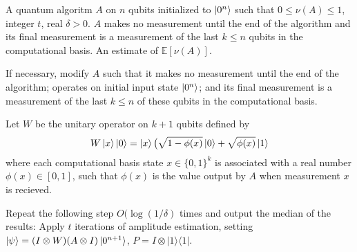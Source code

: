 \documentclass{article}
\begin{document}
\pagestyle{empty} 

\begin{algorithm}[ht]
	\caption{} 
	\begin{algorithmic}[1]

		\Require  A quantum algoritm $A$ on $n$ qubits initialized to $\ket{0^n}$ such that $0\leq \nu(A) \leq 1$, integer $t$, real $\delta>0$. $A$ makes no measurement until the end of the algorithm and its final measurement is a measurement of the last $k\leq n$ qubits in the computational basis.
		\Ensure An estimate of $\mathbb{E}[\nu(A)]$.
		\vspace{10pt}
		\Statex 
		
		\State If necessary, modify $A$ such that it makes no measurement until the end of the algorithm; operates on initial input state $\ket{0^n}$; and its final measurement is a measurement of the last $k\leq n$ of these qubits in the computational basis.
		
		\State Let $W$ be the unitary operator on $k+1$ qubits defined by 
		       \begin{equation}
		       W\ket{x}\ket{0} =\ket{x}\big(\sqrt{1-\phi(x)}\ket{0}+\sqrt{\phi(x)}\ket{1}
		       \end{equation}
		       where each computational basis state $x \in \{0,1\}^k$ is associated with a real number $\phi(x) \in [0,1]$, such that $\phi(x)$ is the value output by $A$ when measurement $x$ is recieved.
		       
		 \State Repeat the following step $O(\log(1/\delta)$ times and output the median of the results:
		 Apply $t$ iterations of amplitude estimation, setting $\ket{\psi} = (I \otimes W)(A \otimes I)\ket{0^{n+1}}$, $P = I \otimes |1\rangle\langle 1|$.
		

	\end{algorithmic}
\end{algorithm}
\end{document}
